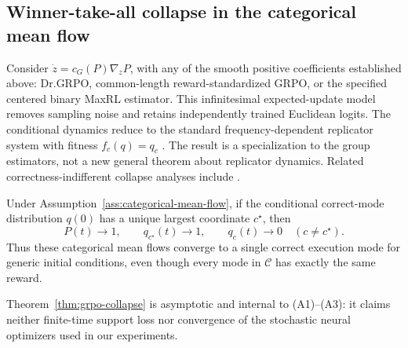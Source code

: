\subsection{Winner-take-all collapse in the categorical mean flow}
\label{app:theory-collapse}

Consider $\dot z=c_G(P)\nabla_zP$, with any of the smooth positive
coefficients established above: Dr.GRPO, common-length reward-standardized
GRPO, or the specified centered binary MaxRL estimator. This infinitesimal
expected-update model removes
sampling noise and retains independently trained Euclidean logits. The
conditional dynamics reduce to the standard frequency-dependent replicator
system with fitness $f_c(q)=q_c$
\citep{hofbauer1998evolutionary,harper2009informationgeometry}. The result is
a specialization to the group estimators, not a new general theorem about
replicator dynamics. Related correctness-indifferent collapse analyses include
\citet{sinha2026expected,lochab2026ucpo}.

\begin{theorem}
\enforcehalffinalproseline
\label{thm:grpo-collapse}
Under Assumption~\ref{ass:categorical-mean-flow}, if the conditional correct-mode
distribution $q(0)$ has a unique largest coordinate $c^\star$, then
\[
  P(t)\longrightarrow1,
  \qquad
  q_{c^\star}(t)\longrightarrow1,
  \qquad
  q_c(t)\longrightarrow0\quad(c\ne c^\star).
\]
Thus these categorical mean flows converge to a single correct execution
mode for generic initial conditions, even though every mode in $\mathcal C$
has exactly the same reward.
\end{theorem}

\begin{remark}
Theorem~\ref{thm:grpo-collapse} is asymptotic and internal to (A1)--(A3): it
claims neither finite-time support loss nor convergence of the stochastic
neural optimizers used in our experiments.
\end{remark}

